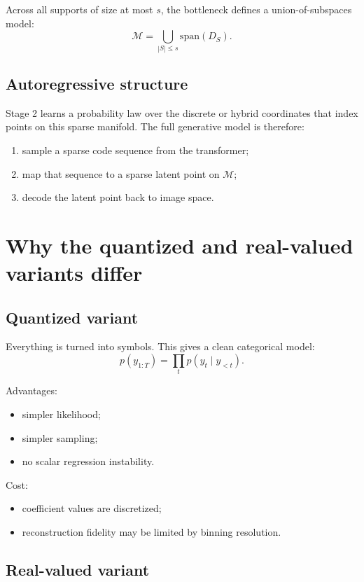 \documentclass[11pt]{article}
\begin{document}
Across all supports of size at most $s$, the bottleneck defines a union-of-subspaces model:
\[
\mathcal{M}
=
\bigcup_{|S| \le s} \mathrm{span}(D_S).
\]

\subsection{Autoregressive structure}

Stage 2 learns a probability law over the discrete or hybrid coordinates that index points on this sparse manifold. The full generative model is therefore:
\begin{enumerate}
  \item sample a sparse code sequence from the transformer;
  \item map that sequence to a sparse latent point on $\mathcal{M}$;
  \item decode the latent point back to image space.
\end{enumerate}

\section{Why the quantized and real-valued variants differ}

\subsection{Quantized variant}

Everything is turned into symbols. This gives a clean categorical model:
\[
p(y_{1:T}) = \prod_t p(y_t \mid y_{<t}).
\]

Advantages:
\begin{itemize}
  \item simpler likelihood;
  \item simpler sampling;
  \item no scalar regression instability.
\end{itemize}

Cost:
\begin{itemize}
  \item coefficient values are discretized;
  \item reconstruction fidelity may be limited by binning resolution.
\end{itemize}

\subsection{Real-valued variant}
\end{document}
